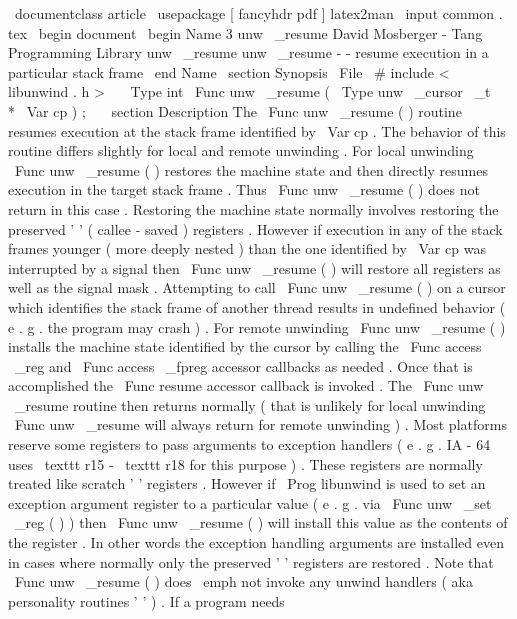 \
documentclass
{
article
}
\
usepackage
[
fancyhdr
pdf
]
{
latex2man
}
\
input
{
common
.
tex
}
\
begin
{
document
}
\
begin
{
Name
}
{
3
}
{
unw
\
_resume
}
{
David
Mosberger
-
Tang
}
{
Programming
Library
}
{
unw
\
_resume
}
unw
\
_resume
-
-
resume
execution
in
a
particular
stack
frame
\
end
{
Name
}
\
section
{
Synopsis
}
\
File
{
\
#
include
<
libunwind
.
h
>
}
\
\
\
Type
{
int
}
\
Func
{
unw
\
_resume
}
(
\
Type
{
unw
\
_cursor
\
_t
~
*
}
\
Var
{
cp
}
)
;
\
\
\
section
{
Description
}
The
\
Func
{
unw
\
_resume
}
(
)
routine
resumes
execution
at
the
stack
frame
identified
by
\
Var
{
cp
}
.
The
behavior
of
this
routine
differs
slightly
for
local
and
remote
unwinding
.
For
local
unwinding
\
Func
{
unw
\
_resume
}
(
)
restores
the
machine
state
and
then
directly
resumes
execution
in
the
target
stack
frame
.
Thus
\
Func
{
unw
\
_resume
}
(
)
does
not
return
in
this
case
.
Restoring
the
machine
state
normally
involves
restoring
the
preserved
'
'
(
callee
-
saved
)
registers
.
However
if
execution
in
any
of
the
stack
frames
younger
(
more
deeply
nested
)
than
the
one
identified
by
\
Var
{
cp
}
was
interrupted
by
a
signal
then
\
Func
{
unw
\
_resume
}
(
)
will
restore
all
registers
as
well
as
the
signal
mask
.
Attempting
to
call
\
Func
{
unw
\
_resume
}
(
)
on
a
cursor
which
identifies
the
stack
frame
of
another
thread
results
in
undefined
behavior
(
e
.
g
.
the
program
may
crash
)
.
For
remote
unwinding
\
Func
{
unw
\
_resume
}
(
)
installs
the
machine
state
identified
by
the
cursor
by
calling
the
\
Func
{
access
\
_reg
}
and
\
Func
{
access
\
_fpreg
}
accessor
callbacks
as
needed
.
Once
that
is
accomplished
the
\
Func
{
resume
}
accessor
callback
is
invoked
.
The
\
Func
{
unw
\
_resume
}
routine
then
returns
normally
(
that
is
unlikely
for
local
unwinding
\
Func
{
unw
\
_resume
}
will
always
return
for
remote
unwinding
)
.
Most
platforms
reserve
some
registers
to
pass
arguments
to
exception
handlers
(
e
.
g
.
IA
-
64
uses
\
texttt
{
r15
}
-
\
texttt
{
r18
}
for
this
purpose
)
.
These
registers
are
normally
treated
like
scratch
'
'
registers
.
However
if
\
Prog
{
libunwind
}
is
used
to
set
an
exception
argument
register
to
a
particular
value
(
e
.
g
.
via
\
Func
{
unw
\
_set
\
_reg
}
(
)
)
then
\
Func
{
unw
\
_resume
}
(
)
will
install
this
value
as
the
contents
of
the
register
.
In
other
words
the
exception
handling
arguments
are
installed
even
in
cases
where
normally
only
the
preserved
'
'
registers
are
restored
.
Note
that
\
Func
{
unw
\
_resume
}
(
)
does
\
emph
{
not
}
invoke
any
unwind
handlers
(
aka
personality
routines
'
'
)
.
If
a
program
needs

